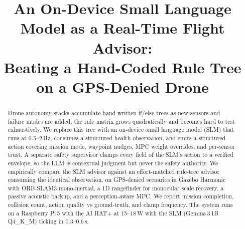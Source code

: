 \documentclass[conference]{IEEEtran}
\title{An On-Device Small Language Model as a Real-Time Flight
       Advisor:\\Beating a Hand-Coded Rule Tree on a GPS-Denied Drone}
\author{\IEEEauthorblockN{Anonymous}
\IEEEauthorblockA{Affiliation\\
email@example.com}}
\begin{document}
\maketitle

\begin{abstract}
Drone autonomy stacks accumulate hand-written if/else trees as new
sensors and failure modes are added; the rule matrix grows
quadratically and becomes hard to test exhaustively. We replace this
tree with an on-device small language model (SLM) that runs at
0.5--2\,Hz, consumes a structured health observation, and emits a
structured action covering mission mode, waypoint nudges, MPC weight
overrides, and per-sensor trust. A separate safety supervisor clamps
every field of the SLM's action to a verified envelope, so the LLM
is contextual judgment but never the safety authority. We
empirically compare the SLM advisor against an effort-matched
rule-tree advisor consuming the identical observation, on
GPS-denied scenarios in Gazebo Harmonic with ORB-SLAM3
mono-inertial, a 1D rangefinder for monocular scale recovery, a
passive acoustic backup, and a perception-aware MPC. We report
mission completion, collision count, action quality vs
ground-truth, and clamp frequency. The system runs on a Raspberry
Pi\,5 with the AI HAT+ at 15--18\,W with the SLM (Gemma\,3\,1B
Q4\_K\_M) ticking in 0.3--0.6\,s.
\end{abstract}









\end{document}
